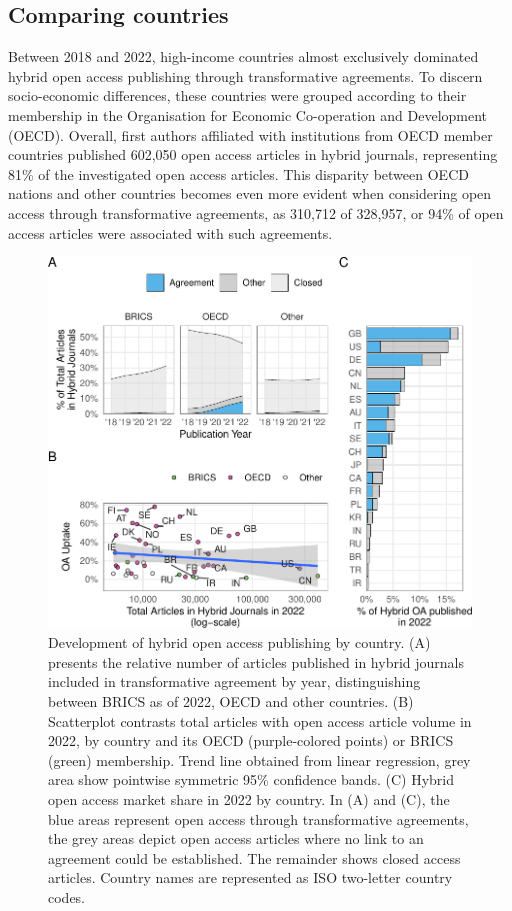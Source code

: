 \documentclass[a4paper,man,floatsintext,longtable,noextraspace,12pt]{apa6}
\begin{document}
\subsection{Comparing countries}\label{comparing-countries}

Between 2018 and 2022, high-income countries almost exclusively
dominated hybrid open access publishing through transformative
agreements. To discern socio-economic differences, these countries were
grouped according to their membership in the Organisation for Economic
Co-operation and Development (OECD). Overall, first authors affiliated
with institutions from OECD member countries published 602,050 open
access articles in hybrid journals, representing 81\% of the
investigated open access articles. This disparity between OECD nations
and other countries becomes even more evident when considering open
access through transformative agreements, as 310,712 of 328,957, or 94\%
of open access articles were associated with such agreements.

\begin{figure}[ht!]

{\centering \includegraphics[width=0.99\linewidth,]{fig/country_patch-1} 

}

\caption{Development of hybrid open access publishing by country. (A) presents the relative number of articles published in hybrid journals included in transformative agreement by year, distinguishing between BRICS as of 2022, OECD and other countries. (B) Scatterplot contrasts total articles with open access article volume in 2022, by country and its OECD (purple-colored points) or BRICS (green) membership. Trend line obtained from linear regression, grey area show pointwise symmetric 95\% confidence bands. (C) Hybrid open access market share in 2022 by country. In (A) and (C), the blue areas represent open access through transformative agreements, the grey areas depict open access articles where no link to an agreement could be established. The remainder shows closed access articles. Country names are represented as ISO two-letter country codes.}\label{fig:country_patch}
\end{figure}
\end{document}
